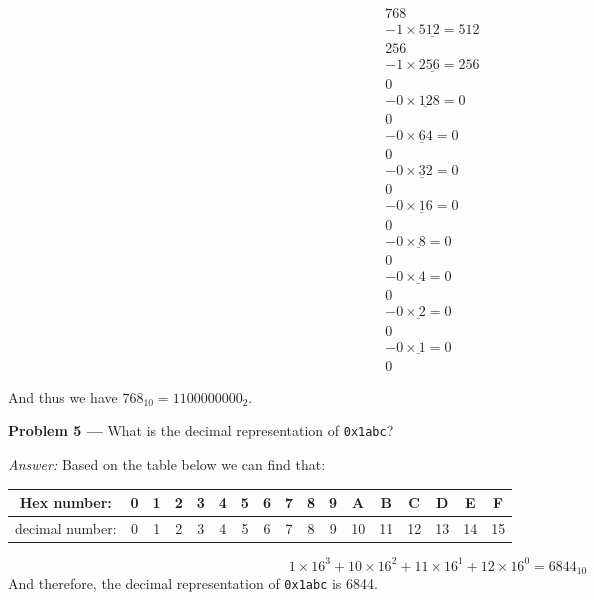 \documentclass[11pt]{article}
\newcommand{\problem}[1]{\vspace*{2ex}\textbf{Problem #1 ---} }
\newcommand{\answer}{\textit{Answer: } }
\begin{document}
\begin{equation*}
  \begin{split}
    768&\\
    \underline{-1 \times 512 = 512}&\\
    256&\\
    \underline{-1 \times 256 = 256}&\\
    0&\\
    \underline{-0 \times 128 = 0}&\\
    0&\\
    \underline{-0 \times 64 = 0}&\\
    0&\\
    \underline{-0 \times 32 = 0}&\\
    0&\\
    \underline{-0 \times 16 = 0}&\\
    0&\\
    \underline{-0 \times 8 = 0}&\\
    0&\\
    \underline{-0 \times 4 = 0}&\\
    0&\\
    \underline{-0 \times 2 = 0}&\\
    0&\\
    \underline{-0 \times 1 = 0}&\\
    0&
  \end{split}
\end{equation*}

And thus we have $768_{10} = 1100000000_{2}$.

\problem{5} What is the decimal representation of \texttt{0x1abc}?

\answer 
Based on the table below we can find that:\\

\begin{center}
 \begin{tabular}{||c c c c c c c c c c c c c c c c c||} 
 \hline
 Hex number: & 0 & 1 & 2 & 3 & 4 & 5 & 6 & 7 & 8 & 9 & A & B & C & D & E & F \\ [0.5ex] 
 \hline
 decimal number: & 0 & 1 & 2 & 3 & 4 & 5 & 6 & 7 & 8 & 9 & 10 & 11 & 12 & 13 & 14 & 15\\ 
 \hline    
 \end{tabular}
\end{center}

\begin{equation*}
    1 \times 16^3 + 10 \times 16^2 + 11 \times 16^1 + 12 \times 16^0 = 6844_{10}
\end{equation*}
And therefore, the decimal representation of \texttt{0x1abc} is 6844.
\end{document}
